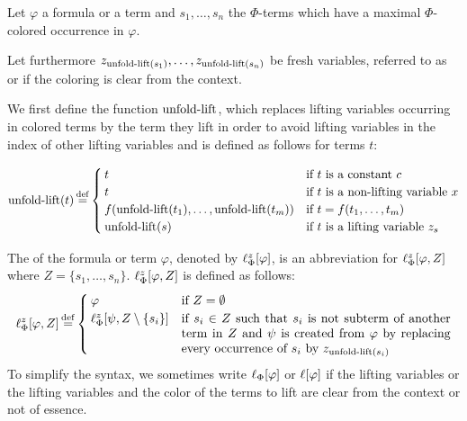 \begin{defi}[Lifting]
\newcommand{\colterm}[1]{s_{#1}}
Let $\varphi$ a formula or a term and $\colterm{1}, \dotsc, \colterm{n}$ the $\Phi$-terms which have a maximal $\Phi$-colored occurrence in $\varphi$.

	Let furthermore $z_{\expa(\colterm{1})}, \ldots, z_{\expa(\colterm{n})}$ be fresh variables, referred to as  or  if the coloring is clear from the context.

	We first define the function $\operatorname{unfold-lift}$, which replaces lifting variables occurring in colored terms by the term they lift in order to avoid lifting variables in the index of other lifting variables and is defined as follows for terms $t$:
	\medskip

	\begin{adjustwidth}{-1em}{}
		\noindent $
		\expa(t) \defeq \begin{cases}
			t & \text{if $t$ is a constant $c$} \\
			t & \text{if $t$ is a non-lifting variable $x$} \\
			f(\expa(t_1),\dots, \expa(t_m)) & \text{if $t=f(t_1, \dots, t_m)$} \\
			\expa(s) & \text{if $t$ is a lifting variable $z_s$}
	\end{cases}
	$
	\end{adjustwidth}
	\medskip

	The  of the formula or term $\varphi$, denoted by $\ell_{\Phi}^{z}[\varphi]$, is an abbreviation for 
	$\ell_{\Phi}^{z}[\varphi, Z]$ where $Z = \{ \colterm{1}, \dotsc, \colterm{n} \}$.
		$\ell_{\Phi}^{z}[\varphi, Z]$ is defined as follows:
	\[
		\lifphi{\varphi, Z} \defeq
		\begin{cases}
			\varphi & \text{if $Z = \emptyset$} \\
			\lifphi{\psi, Z\setminus\{\colterm{i}\}} & \parbox[t]{0.622\linewidth}{if $\colterm{i} \in Z$ such that $s_i$ is not subterm of another term in $Z$ and $\psi$ is created from $\varphi$ by replacing every occurrence of $\colterm{i}$ by $z_{\expa(\colterm{i})}$} 
		\end{cases}
	\]
	To simplify the syntax, we sometimes write $\ell_{\Phi}[\varphi]$ or $\ell[\varphi]$ if the lifting variables or the lifting variables and the color of the terms to lift are clear from the context or not of essence.
\end{defi}

